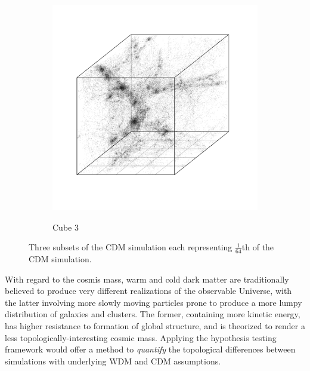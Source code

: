\documentclass[12pt]{article}
\begin{document}
\begin{figure}[htp!]
\begin{subfigure}{0.31\textwidth}
    \label{fig:cubeDiagsB}
  \end{subfigure}
    \begin{subfigure}{0.31\textwidth}
    \centering
        \caption{Cube 3}
  \includegraphics[width=\linewidth]{figure_10_cdm_slice_51.pdf}
    \label{fig:cubeDiagsC}
  \end{subfigure}
    \caption{Three subsets of the CDM simulation each representing $\frac{1}{64}$th of the CDM simulation.}
    \label{fig:cubeDiags}
\end{figure}

With regard to the cosmis mass, warm and cold dark matter are traditionally believed to produce very different realizations of the observable Universe, with the latter involving more slowly moving particles prone to produce a more lumpy distribution of galaxies and clusters. The former, containing more kinetic energy, has higher resistance to formation of global structure, and is theorized to render a less topologically-interesting cosmic mass. Applying the hypothesis testing framework would offer a method to \emph{quantify} the topological differences between simulations with underlying WDM and CDM assumptions.
\end{document}

